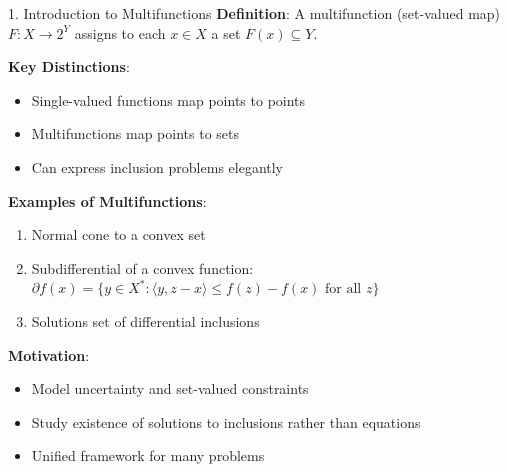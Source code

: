 \documentclass[aspectratio=169,10pt]{beamer}
\begin{document}
\begin{frame}[allowframebreaks]{1. Introduction to Multifunctions}
    \textbf{Definition}: A multifunction (set-valued map) $F: X \to 2^Y$ assigns to each $x \in X$ a set $F(x) \subseteq Y$.

    \vspace{0.4cm}
    \textbf{Key Distinctions}:
    \begin{itemize}
        \item Single-valued functions map points to points
        \item Multifunctions map points to sets
        \item Can express inclusion problems elegantly
    \end{itemize}

    \vspace{0.4cm}
    \textbf{Examples of Multifunctions}:
    \begin{enumerate}
        \item Normal cone to a convex set
        \item Subdifferential of a convex function: $\partial f(x) = \{y \in X^* : \langle y, z-x \rangle \leq f(z) - f(x) \text{ for all } z\}$
        \item Solutions set of differential inclusions
    \end{enumerate}

    \vspace{0.4cm}
    \textbf{Motivation}:
    \begin{itemize}
        \item Model uncertainty and set-valued constraints
        \item Study existence of solutions to inclusions rather than equations
        \item Unified framework for many problems
    \end{itemize}
\end{frame}
\end{document}
